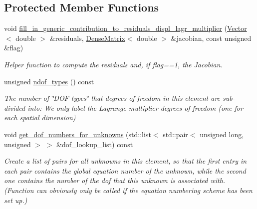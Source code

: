\subsection*{Protected Member Functions}
\begin{DoxyCompactItemize}
\item 
void \hyperlink{classoomph_1_1ImposeDisplacementByLagrangeMultiplierElement_af57cab6b68c332061086aae5e8c393b3}{fill\+\_\+in\+\_\+generic\+\_\+contribution\+\_\+to\+\_\+residuals\+\_\+displ\+\_\+lagr\+\_\+multiplier} (\hyperlink{classoomph_1_1Vector}{Vector}$<$ double $>$ \&residuals, \hyperlink{classoomph_1_1DenseMatrix}{Dense\+Matrix}$<$ double $>$ \&jacobian, const unsigned \&flag)
\begin{DoxyCompactList}\small\item\em Helper function to compute the residuals and, if flag==1, the Jacobian. \end{DoxyCompactList}\item 
unsigned \hyperlink{classoomph_1_1ImposeDisplacementByLagrangeMultiplierElement_a321d06e523a87b42c25ac14a11229ee7}{ndof\+\_\+types} () const
\begin{DoxyCompactList}\small\item\em The number of \char`\"{}\+D\+O\+F types\char`\"{} that degrees of freedom in this element are sub-\/divided into\+: We only label the Lagrange multiplier degrees of freedom (one for each spatial dimension) \end{DoxyCompactList}\item 
void \hyperlink{classoomph_1_1ImposeDisplacementByLagrangeMultiplierElement_aa6fc1525ac4a93f5135a0c58bd211ffb}{get\+\_\+dof\+\_\+numbers\+\_\+for\+\_\+unknowns} (std\+::list$<$ std\+::pair$<$ unsigned long, unsigned $>$ $>$ \&dof\+\_\+lookup\+\_\+list) const
\begin{DoxyCompactList}\small\item\em Create a list of pairs for all unknowns in this element, so that the first entry in each pair contains the global equation number of the unknown, while the second one contains the number of the dof that this unknown is associated with. (Function can obviously only be called if the equation numbering scheme has been set up.) \end{DoxyCompactList}\end{DoxyCompactItemize}
